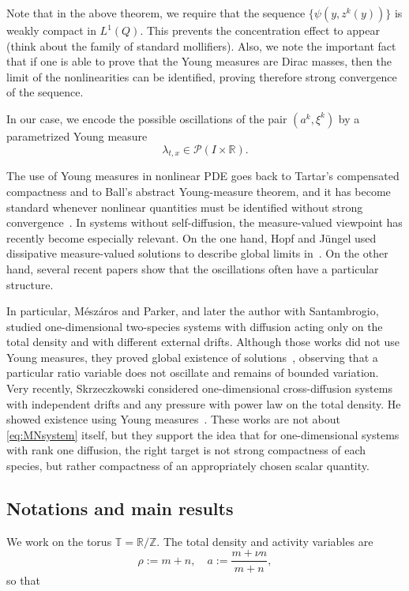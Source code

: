 \documentclass[a4paper,twosided,11pt]{article}
\newcommand{\1}{\mathbf{1}}
\theoremstyle{plain}
\theoremstyle{remark}
\numberwithin{equation}{section}
\begin{document}
Note that in the above theorem, we require that the sequence $\{\psi(y,z^k(y))\}$ is weakly compact in $L^{1}(Q)$. This prevents the concentration effect to appear (think about the family of standard mollifiers). Also, we note the important fact that if one is able to prove that the Young measures are Dirac masses, then the limit of the nonlinearities can be identified, proving therefore strong convergence of the sequence.

In our case, we encode the possible oscillations of the pair $(a^k,\xi^k)$ by a parametrized Young measure
$$
\lambda_{t,x}\in\mathcal P(I\times\mathbb R).
$$


The use of Young measures in nonlinear PDE goes back to Tartar's compensated compactness and to Ball's abstract Young-measure theorem, and it has become standard whenever nonlinear quantities must be identified without strong convergence~\cite{Tartar1979,Ball1989}. In systems without self-diffusion, the measure-valued viewpoint has recently become especially relevant. On the one hand, Hopf and Jüngel used dissipative measure-valued solutions to describe global limits in~\cite{HopfJungel2025}. On the other hand, several recent papers show that the oscillations often have a particular structure.

In particular, Mészáros and Parker, and later the author with Santambrogio, studied one-dimensional two-species systems with diffusion acting only on the total density and with different external drifts. Although those works did not use Young measures, they proved global existence of solutions~\cite{2025arXiv251007937E,MeszarosParker2025,2026arXiv260318770M}, observing that a particular ratio variable does not oscillate and remains of bounded variation. Very recently, Skrzeczkowski considered one-dimensional cross-diffusion systems with independent drifts and any pressure with power law on the total density. He showed existence using Young measures~\cite{Skrzeczkowski2026}. These works are not about \eqref{eq:MNsystem} itself, but they support the idea that for one-dimensional systems with rank one diffusion, the right target is not strong compactness of each species, but rather compactness of an appropriately chosen scalar quantity.


\subsection{Notations and main results}

We work on the torus $\mathbb T=\mathbb R/\mathbb Z$. The total density and activity variables are
$$
\rho:=m+n, \quad a:=\frac{m+\nu n}{m+n},
$$
so that
\end{document}
